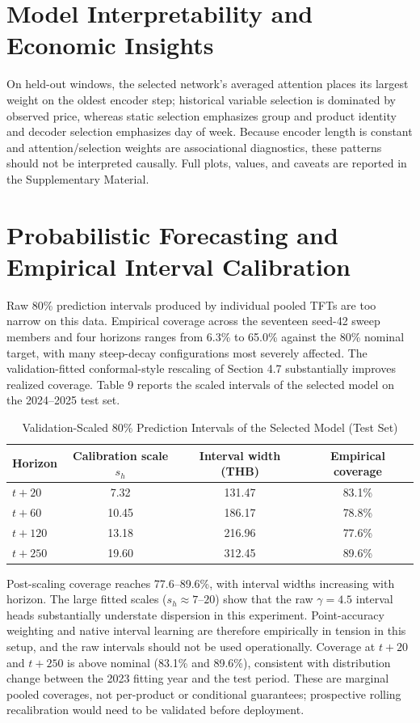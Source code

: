 \documentclass[review,3p,times]{elsarticle}
\begin{document}
\section{Model Interpretability and Economic Insights}

On held-out windows, the selected network's averaged attention places its largest weight on the oldest encoder step; historical variable selection is dominated by observed price, whereas static selection emphasizes group and product identity and decoder selection emphasizes day of week. Because encoder length is constant and attention/selection weights are associational diagnostics, these patterns should not be interpreted causally. Full plots, values, and caveats are reported in the Supplementary Material.


\section{Probabilistic Forecasting and Empirical Interval Calibration}

Raw 80\% prediction intervals produced by individual pooled TFTs are too narrow on this data. Empirical coverage across the seventeen seed-42 sweep members and four horizons ranges from 6.3\% to 65.0\% against the 80\% nominal target, with many steep-decay configurations most severely affected. The validation-fitted conformal-style rescaling of Section 4.7 substantially improves realized coverage. Table 9 reports the scaled intervals of the selected model on the 2024--2025 test set.

\begin{table}[htbp]\centering
\caption{Validation-Scaled 80\% Prediction Intervals of the Selected Model (Test Set)}
\small
\begin{tabular}{lccc}
\toprule
Horizon & Calibration scale $s_h$ & Interval width (THB) & Empirical coverage \\
\midrule
$t+20$ & 7.32 & 131.47 & 83.1\% \\
$t+60$ & 10.45 & 186.17 & 78.8\% \\
$t+120$ & 13.18 & 216.96 & 77.6\% \\
$t+250$ & 19.60 & 312.45 & 89.6\% \\
\bottomrule
\end{tabular}
\end{table}

Post-scaling coverage reaches 77.6--89.6\%, with interval widths increasing with horizon. The large fitted scales ($s_h \approx 7$--$20$) show that the raw $\gamma=4.5$ interval heads substantially understate dispersion in this experiment. Point-accuracy weighting and native interval learning are therefore empirically in tension in this setup, and the raw intervals should not be used operationally. Coverage at $t+20$ and $t+250$ is above nominal (83.1\% and 89.6\%), consistent with distribution change between the 2023 fitting year and the test period. These are marginal pooled coverages, not per-product or conditional guarantees; prospective rolling recalibration would need to be validated before deployment.
\end{document}
